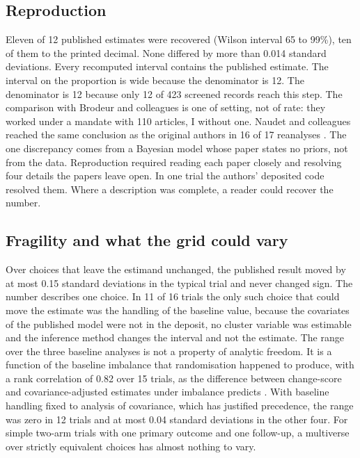 \subsection{Reproduction}\label{reproduction-1}

Eleven of 12 published estimates were recovered (Wilson interval 65 to 99\%), ten of them to the printed decimal. None differed by more than 0.014 standard deviations. Every recomputed interval contains the published estimate. The interval on the proportion is wide because the denominator is 12. The denominator is 12 because only 12 of 423 screened records reach this step. The comparison with Brodeur and colleagues is one of setting, not of rate: they worked under a mandate with 110 articles, I without one. Naudet and colleagues reached the same conclusion as the original authors in 16 of 17 reanalyses \cite{Naudet_2018}. The one discrepancy comes from a Bayesian model whose paper states no priors, not from the data. Reproduction required reading each paper closely and resolving four details the papers leave open. In one trial the authors' deposited code resolved them. Where a description was complete, a reader could recover the number.

\subsection{Fragility and what the grid could vary}\label{fragility-and-what-the-grid-could-vary}

Over choices that leave the estimand unchanged, the published result moved by at most 0.15 standard deviations in the typical trial and never changed sign. The number describes one choice. In 11 of 16 trials the only such choice that could move the estimate was the handling of the baseline value, because the covariates of the published model were not in the deposit, no cluster variable was estimable and the inference method changes the interval and not the estimate. The range over the three baseline analyses is not a property of analytic freedom. It is a function of the baseline imbalance that randomisation happened to produce, with a rank correlation of 0.82 over 15 trials, as the difference between change-score and covariance-adjusted estimates under imbalance predicts \cite{Senn_2006,Van_Breukelen_2006}. With baseline handling fixed to analysis of covariance, which has justified precedence, the range was zero in 12 trials and at most 0.04 standard deviations in the other four. For simple two-arm trials with one primary outcome and one follow-up, a multiverse over strictly equivalent choices has almost nothing to vary.

